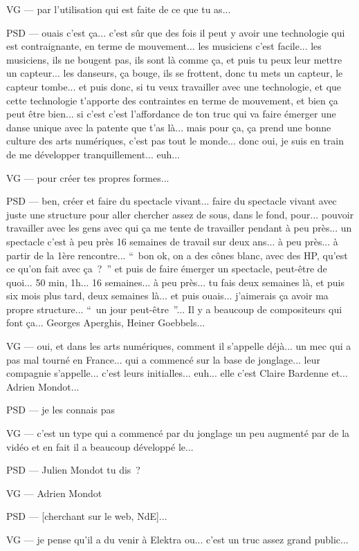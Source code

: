 VG — par l'utilisation qui est faite de ce que tu as...

PSD — ouais c'est ça... c'est sûr que des fois il peut y avoir une technologie qui est contraignante, en terme de mouvement... les musiciens c'est facile... les musiciens, ils ne bougent pas, ils sont là comme ça, et puis  tu peux leur mettre un capteur... les danseurs, ça bouge, ils se frottent, donc tu mets un capteur, le capteur tombe... et puis donc, si tu veux travailler avec une technologie, et que cette technologie t'apporte des contraintes en terme de mouvement, et bien ça peut être bien... si c'est c'est l'affordance de ton truc qui va faire émerger une danse unique avec la patente que t'as là... mais pour ça, ça prend une bonne culture des arts numériques, c'est pas tout le monde... donc oui, je suis en train de me développer tranquillement... euh...

VG — pour créer tes propres formes...

PSD — ben, créer et faire du spectacle vivant... faire du spectacle vivant avec juste une structure pour aller chercher assez de sous, dans le fond, pour... pouvoir travailler avec les gens avec qui ça me tente de travailler pendant à peu près... un spectacle c'est à peu près 16 semaines de travail sur deux ans... à peu près... à partir de la 1ère rencontre... “ bon ok, on a des cônes blanc, avec des HP, qu'est ce qu'on fait avec ça ? ” et puis de faire émerger un spectacle, peut-être de quoi... 50 min, 1h... 16 semaines... à peu près... tu fais deux semaines là,  et puis six mois plus tard, deux semaines là... et puis ouais... j'aimerais ça avoir ma propre structure... “ un jour peut-être ”... Il y a beaucoup de compositeurs qui font ça... Georges Aperghis, Heiner Goebbels...

VG — oui, et dans les arts numériques, comment il s'appelle déjà... un mec qui a pas mal tourné en France... qui a commencé sur la base de jonglage... leur compagnie s'appelle... c'est leurs initialles... euh... elle c'est Claire Bardenne et... Adrien Mondot...

PSD — je les connais pas

VG — c'est un type qui a commencé par du jonglage un peu  augmenté par de la vidéo et en fait il a beaucoup développé le...

PSD — Julien Mondot tu dis ?

VG — Adrien Mondot 

PSD — [cherchant sur le web, NdE]...

VG — je pense qu'il a du venir à Elektra ou... c'est un truc assez grand public...

